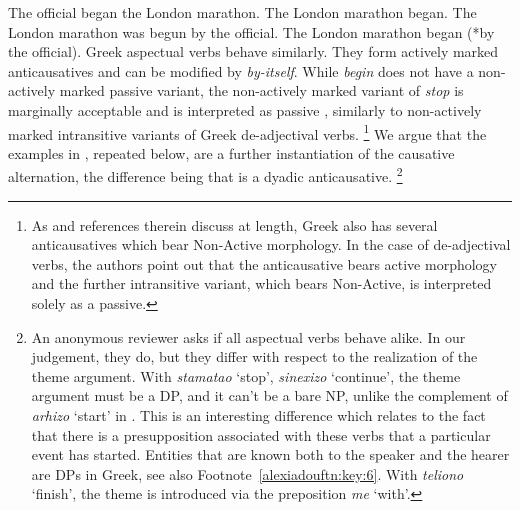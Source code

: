 \documentclass[output=paper]{langscibook}
\begin{document}
\ea%
    \label{alexiadouex:key:6}
    \ea The official began the London marathon.
    \ex The London marathon began.
    \ex The London marathon was begun by the official.
    \ex The London marathon began (*by the official).
    \z 
\z
Greek aspectual verbs behave similarly. 
They form actively marked anticausatives and can be modified by \textit{by-itself}. 
While \textit{begin} does not have a non-actively marked passive variant, 
the non-actively marked variant of \textit{stop} is marginally acceptable and is interpreted as passive , 
similarly to non-actively marked intransitive variants of Greek de-adjectival verbs.%
\footnote{As \citet{AlexiadouAnagnostopoulouSchafer2015} and references therein discuss at length, 
    Greek also has several anticausatives which bear Non-Active morphology. 
    In the case of de-adjectival verbs, the authors point out that the anticausative bears active morphology and the further intransitive variant, 
    which bears Non-Active, is interpreted solely as a passive.}
\ea%
    \judgewidth{\%}
    \label{alexiadouex:key:7}
    \z 
\z 
We argue that the examples in , repeated below, are a further instantiation of the causative alternation, 
the difference being that  is a dyadic anticausative.%
\footnote{An anonymous reviewer asks if all aspectual verbs behave alike. 
    In our judgement, they do, but they differ with respect to the realization of the theme argument. 
    With \textit{stamatao} ‘stop’, \textit{sinexizo} `continue’, the theme argument must be a DP, 
    and it can't be a bare NP, unlike the complement of \textit{arhizo} `start' in .    
    This is an interesting difference which relates to the fact that there is a presupposition associated with these verbs that a particular event has started. 
    Entities that are known both to the speaker and the hearer are DPs in Greek, see also Footnote~\ref{alexiadouftn:key:6}. 
    With \textit{teliono} ‘finish’, the theme is introduced via  the preposition \textit{me} ‘with’.
}
\end{document}
